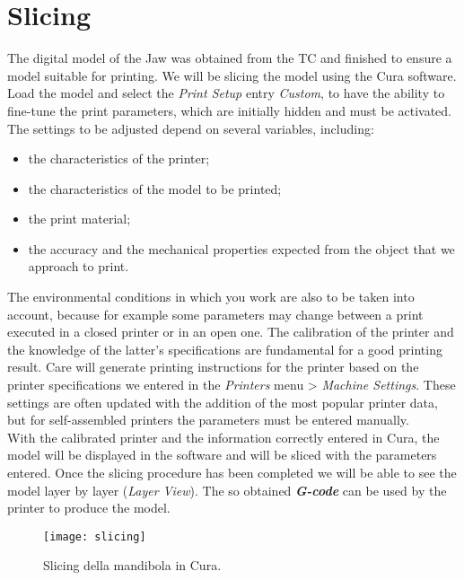 \section{Slicing}
The digital model of the Jaw was obtained from the TC and finished to ensure a model suitable for printing. We will be slicing the model using the Cura software.
Load the model and select the \emph{Print Setup} entry \emph{Custom}, to have the ability to fine-tune the print parameters, which are initially hidden and must be activated. \\
The settings to be adjusted depend on several variables, including:

\begin{itemize}
\item the characteristics of the printer;
\item the characteristics of the model to be printed;
\item the print material;
\item the accuracy and the mechanical properties expected from the object that we approach to print.
\end{itemize}

The environmental conditions in which you work are also to be taken into account, because for example some parameters may change between a print executed in a closed printer or in an open one.
The calibration of the printer and the knowledge of the latter's specifications are fundamental for a good printing result. Care will generate printing instructions for the printer based on the printer specifications we entered in the \emph{Printers} menu > \emph{Machine Settings}. These settings are often updated with the addition of the most popular printer data, but for self-assembled printers the parameters must be entered manually. \\
With the calibrated printer and the information correctly entered in Cura, the model will be displayed in the software and will be sliced with the parameters entered. Once the slicing procedure has been completed we will be able to see the model layer by layer (\emph{Layer View}).
The so obtained \emph{\textbf{G-code}} can be used by the printer to produce the model.
\begin{figure}[t]
\centering
\texttt{[image: slicing]}
\caption{Slicing della mandibola in Cura.}
\label{fig:slicing}
\end{figure}

